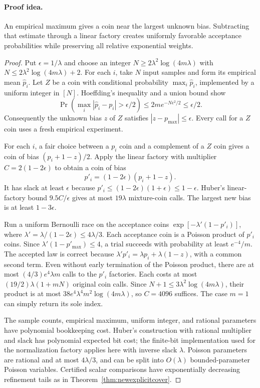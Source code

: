 \paragraph{Proof idea.}
An empirical maximum gives a coin near the largest unknown bias.  Subtracting that estimate through a linear factory creates uniformly favorable acceptance probabilities while preserving all relative exponential weights.

\begin{proof}
Put $\epsilon=1/\lambda$ and choose an integer
$N\ge2\lambda^2\log(4m\lambda)$ with
$N\le2\lambda^2\log(4m\lambda)+2$.
For each $i$, take $N$ input samples and form its empirical mean
$\widehat p_i$. Let $Z$ be a coin with conditional probability
$\max_i\widehat p_i$, implemented by a uniform integer in $[N]$.
Hoeffding's inequality and a union bound show
\[
 \Pr\!\left(\max_i|\widehat p_i-p_i|>\epsilon/2\right)
 \le2m e^{-N\epsilon^2/2}\le\epsilon/2.
\]
Consequently the unknown bias $z$ of $Z$ satisfies
$|z-p_{\max}|\le\epsilon$. Every call for a $Z$ coin uses a fresh
empirical experiment.

For each $i$, a fair choice between a $p_i$ coin and a complement
of a $Z$ coin gives a coin of bias $(p_i+1-z)/2$. Apply the linear
factory with multiplier $C=2(1-2\epsilon)$ to obtain a coin of bias
\[
 p'_i=(1-2\epsilon)(p_i+1-z).
\]
It has slack at least $\epsilon$ because
$p'_i\le(1-2\epsilon)(1+\epsilon)\le1-\epsilon$.
Huber's linear-factory bound $9.5C/\epsilon$ gives at most
$19\lambda$ mixture-coin calls. The largest new bias is at least
$1-3\epsilon$.

Run a uniform Bernoulli race on the acceptance coins
$\exp[-\lambda'(1-p'_i)]$, where
$\lambda'=\lambda/(1-2\epsilon)\le4\lambda/3$.
Each acceptance coin is a Poisson product of $p'_i$ coins.
Since $\lambda'(1-p'_{\max})\le4$, a trial succeeds with
probability at least $e^{-4}/m$. The accepted law is correct because
$\lambda'p'_i=\lambda p_i+\lambda(1-z)$, with a common second term.
Even without early termination of the Poisson product, there are at
most $(4/3)e^4\lambda m$ calls to the $p'_i$ factories.
Each costs at most $(19/2)\lambda(1+mN)$ original coin calls.
Since $N+1\le3\lambda^2\log(4m\lambda)$, their product is at most
$38e^4\lambda^4m^2\log(4m\lambda)$, so $C=4096$ suffices.
The case $m=1$ can simply return its sole index.

The sample counts, empirical maximum, uniform integer, and rational
parameters have polynomial bookkeeping cost. Huber's construction
with rational multiplier and slack has polynomial expected bit
cost; the finite-bit implementation used for the normalization
factory applies here with inverse slack $\lambda$.
Poisson parameters are rational and at most $4\lambda/3$, and can
be split into $O(\lambda)$ bounded-parameter Poisson variables.
Certified scalar comparisons have exponentially decreasing
refinement tails as in Theorem~\ref{thm:newexplicitcover}.
\end{proof}

